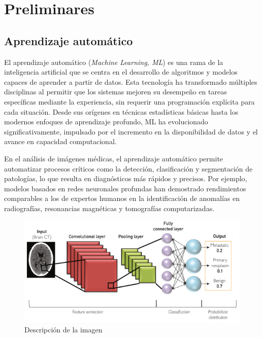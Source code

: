 \documentclass[11pt,spanish,listoffigures,listoftables]{tfgetsinf}
\begin{document}

\chapter{Preliminares}  %

\section{Aprendizaje automático}

El aprendizaje automático (\textit{Machine Learning, ML}) es una rama de la inteligencia artificial que se centra en el desarrollo de algoritmos y modelos capaces de aprender a partir de datos. Esta tecnología ha transformado múltiples disciplinas al permitir que los sistemas mejoren su desempeño en tareas específicas mediante la experiencia, sin requerir una programación explícita para cada situación. Desde sus orígenes en técnicas estadísticas básicas hasta los modernos enfoques de aprendizaje profundo, ML ha evolucionado significativamente, impulsado por el incremento en la disponibilidad de datos y el avance en capacidad computacional. 

En el análisis de imágenes médicas, el aprendizaje automático permite automatizar procesos críticos como la detección, clasificación y segmentación de patologías, lo que resulta en diagnósticos más rápidos y precisos. Por ejemplo, modelos basados en redes neuronales profundas han demostrado rendimientos comparables a los de expertos humanos en la identificación de anomalías en radiografías, resonancias magnéticas y tomografías computarizadas.
\begin{figure}[htbp]
    \centering
    \includegraphics[width=1\textwidth]{neural_network.png}
    \caption{Descripción de la imagen}
    \label{fig:mi_imagen}
  \end{figure}
\end{document}
